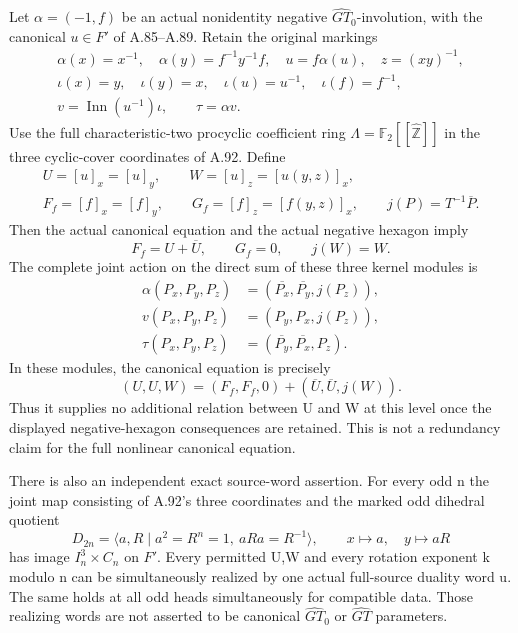 Let \(\alpha=(-1,f)\) be an actual nonidentity negative
\(\widehat{GT}_0\)-involution, with the canonical \(u\in F'\)
of A.85--A.89. Retain the original markings
\[
\begin{gathered}
 \alpha(x)=x^{-1},\quad \alpha(y)=f^{-1}y^{-1}f,
 \quad u=f\alpha(u),\quad z=(xy)^{-1},\\
 \iota(x)=y,\quad\iota(y)=x,\quad
 \iota(u)=u^{-1},\quad\iota(f)=f^{-1},\\
 v=\operatorname{Inn}(u^{-1})\iota,\qquad \tau=\alpha v.
\end{gathered}
\tag{A.93.1}
\]
Use the full characteristic-two procyclic coefficient ring
\(\Lambda=\mathbb F_2[[\widehat{\mathbb Z}]]\) in the three
cyclic-cover coordinates of A.92. Define
\[
\begin{gathered}
 U=[u]_x=[u]_y,\qquad W=[u]_z=[u(y,z)]_x,\\
 F_f=[f]_x=[f]_y,\qquad G_f=[f]_z=[f(y,z)]_x,
 \qquad j(P)=T^{-1}\overline P.
\end{gathered}
\tag{A.93.2}
\]
Then the actual canonical equation and the actual negative
hexagon imply
\[
             F_f=U+\overline U,\qquad G_f=0,
             \qquad j(W)=W.
\tag{A.93.3}
\]
The complete joint action on the direct sum of these three
kernel modules is
\[
\begin{aligned}
 \alpha(P_x,P_y,P_z)&=(\overline{P_x},\overline{P_y},j(P_z)),\\
 v(P_x,P_y,P_z)&=(P_y,P_x,j(P_z)),\\
 \tau(P_x,P_y,P_z)&=(\overline{P_y},\overline{P_x},P_z).
\end{aligned}
\tag{A.93.4}
\]
In these modules, the canonical equation is precisely
\[
 (U,U,W)=(F_f,F_f,0)+(\overline U,\overline U,j(W)).
\tag{A.93.5}
\]
Thus it supplies no additional relation between U and W at
this level once the displayed negative-hexagon consequences
are retained. This is not a redundancy claim for the full
nonlinear canonical equation.

There is also an independent exact source-word assertion.
For every odd n the joint map consisting of A.92's three
coordinates and the marked odd dihedral quotient
\[
 D_{2n}=\langle a,R\mid a^2=R^n=1,\ aRa=R^{-1}\rangle,
 \qquad x\mapsto a,\quad y\mapsto aR
\tag{A.93.6}
\]
has image \(I_n^3\times C_n\) on \(F'\). Every permitted
U,W and every rotation exponent k modulo n can be simultaneously
realized by one actual full-source duality word u. The same
holds at all odd heads simultaneously for compatible data.
Those realizing words are not asserted to be canonical
\(\widehat{GT}_0\) or \(\widehat{GT}\) parameters.

